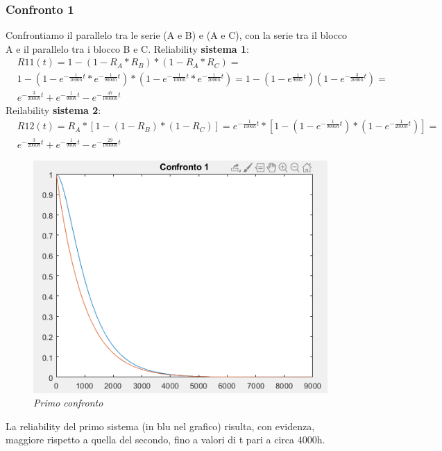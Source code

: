 \subsubsection{Confronto 1}
Confrontiamo il parallelo tra le serie (A e B) e (A e C), con la serie tra il blocco A e il parallelo tra i blocco B e C.
Reliability \textbf{sistema 1}:
\begin{equation*}
	\begin{split}
		&R11(t) = 1-(1-R_A*R_B)*(1-R_A*R_C) = \\
		&1-(1-e^{-\frac{1}{1000h} t}*e^{-\frac{1}{9000h} t})*(1-e^{-\frac{1}{1000h} t}*e^{-\frac{1}{2000h} t}) = 1 -(1-e^{\frac{1}{900h} t})(1-e^{-\frac{3}{2000h}t}) = \\
		&e^{-\frac{3}{2000h}t}+e^{-\frac{1}{900h}t}-e^{-\frac{47}{18000h}t}
	\end{split}
\end{equation*}
Reilability \textbf{sistema 2}:
\begin{equation*}
	\begin{split}
		&R12(t) = R_A * [1-(1-R_B)*(1-R_C)] = e^{-\frac{1}{1000h} t}*[1-(1-e^{-\frac{1}{9000h} t})*(1-e^{-\frac{1}{2000h} t})] = \\
		& e^{-\frac{3}{2000h}t}+e^{-\frac{1}{900h}t}-e^{-\frac{29}{18000h}t}
	\end{split}
\end{equation*}
\begin{figure}[H]
	\centering
	\includegraphics[width=\textwidth]{img/hw5/es4_1.png}
	\caption{\textit{Primo confronto}}
\end{figure}
La reliability del primo sistema (in blu nel grafico) risulta, con evidenza, maggiore rispetto a quella del secondo, fino a valori di t pari a circa 4000h.
